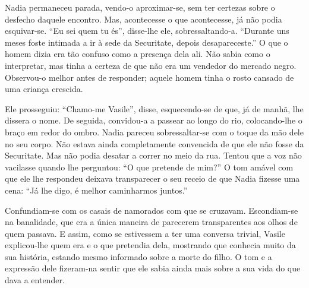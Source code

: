 Nadia permaneceu parada, vendo-o aproximar-se, sem ter certezas sobre o
desfecho daquele encontro. Mas, acontecesse o que acontecesse, já não
podia esquivar-se. ``Eu sei quem tu és'', disse-lhe ele, sobressaltando-a.
``Durante uns meses foste intimada a ir à sede da Securitate, depois
desapareceste.'' O que o homem dizia era tão confuso como a presença
dela ali. Não sabia como o interpretar, mas tinha a certeza de que não
era um vendedor do mercado negro. Observou-o melhor antes de responder;
aquele homem tinha o rosto cansado de uma criança crescida.

Ele prosseguiu: ``Chamo-me Vasile'', disse, esquecendo-se de que, já de manhã, lhe dissera o nome. De seguida, convidou-a a
passear ao longo do rio, colocando-lhe o braço em redor do ombro. Nadia
pareceu sobressaltar-se com o toque da mão dele no seu corpo. Não estava
ainda completamente convencida de que ele não fosse da Securitate. Mas
não podia desatar a correr no meio da rua. Tentou que a voz não
vacilasse quando lhe perguntou: ``O que pretende de mim?'' O tom amável
com que ele lhe respondeu deixava transparecer o seu receio de que
Nadia fizesse uma cena: ``Já lhe digo, é melhor caminharmos juntos.''

Confundiam-se com os casais de namorados com que se cruzavam.
Escondiam-se na banalidade, que era a única maneira de parecerem
transparentes aos olhos de quem passava. E assim, como se estivessem a
ter uma conversa trivial, Vasile explicou-lhe quem era e o que pretendia
dela, mostrando que conhecia muito da sua história, estando mesmo
informado sobre a morte do filho. O tom e a expressão dele fizeram-na
sentir que ele sabia ainda mais sobre a sua vida do que dava a entender.


